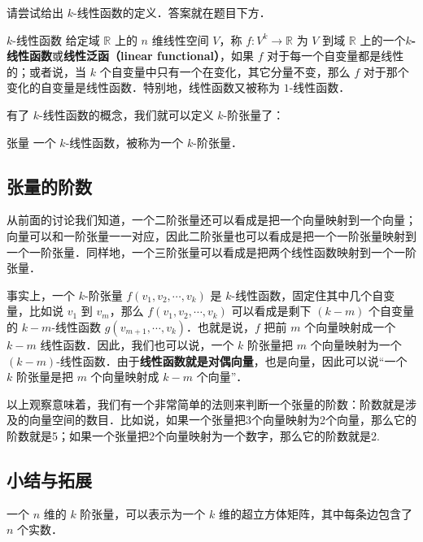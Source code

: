 \begin{exercise}{}
请尝试给出 $k$-线性函数的定义．答案就在题目下方．
\end{exercise}

\begin{definition}{$k$-线性函数}
给定域 $\mathbb{R}$ 上的 $n$ 维线性空间 $V$，称 $f:V^k\rightarrow \mathbb{R}$ 为 $V$ 到域 $\mathbb{R}$ 上的一个\textbf{$k$-线性函数}或\textbf{线性泛函（linear functional）}，如果 $f$ 对于每一个自变量都是线性的；或者说，当 $k$ 个自变量中只有一个在变化，其它分量不变，那么 $f$ 对于那个变化的自变量是线性函数．特别地，线性函数又被称为 $1$-线性函数．
\end{definition}

有了 $k$-线性函数的概念，我们就可以定义 $k$-阶张量了：

\begin{definition}{张量}
一个 $k$-线性函数，被称为一个 $k$-阶张量．
\end{definition}

\subsection{张量的阶数}

从前面的讨论我们知道，一个二阶张量还可以看成是把一个向量映射到一个向量；向量可以和一阶张量一一对应，因此二阶张量也可以看成是把一个一阶张量映射到一个一阶张量．同样地，一个三阶张量可以看成是把两个线性函数映射到一个一阶张量．

事实上，一个 $k$-阶张量 $f({v}_1, {v}_2, \cdots,{v}_k)$ 是 $k$-线性函数，固定住其中几个自变量，比如说 ${v}_1$ 到 ${v}_m$，那么 $f({v}_1, {v}_2,\cdots,{v}_k)$ 可以看成是剩下 $(k-m)$ 个自变量的 $k-m$-线性函数 $g({v}_{m+1}, \cdots,{v}_k)$．也就是说，$f$ 把前 $m$ 个向量映射成一个 $k-m$ 线性函数．因此，我们也可以说，一个 $k$ 阶张量把 $m$ 个向量映射为一个 $(k-m)$-线性函数．由于\textbf{线性函数就是对偶向量}，也是向量，因此可以说“一个 $k$ 阶张量是把 $m$ 个向量映射成 $k-m$ 个向量”．

以上观察意味着，我们有一个非常简单的法则来判断一个张量的阶数：阶数就是涉及的向量空间的数目．比如说，如果一个张量把3个向量映射为2个向量，那么它的阶数就是5；如果一个张量把2个向量映射为一个数字，那么它的阶数就是2. 

\subsection{小结与拓展}

一个 $n$ 维的 $k$ 阶张量，可以表示为一个 $k$ 维的超立方体矩阵，其中每条边包含了 $n$ 个实数．

